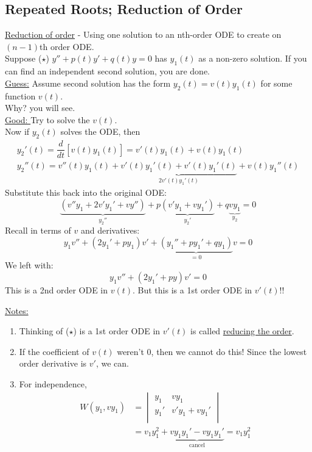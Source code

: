 \subsection*{Repeated Roots; Reduction of Order}
\underline{Reduction of order} - Using one solution to an nth-order ODE to create on $(n-1)$th order ODE.\\
Suppose ($\star$) $y'' + p(t)y' + q(t)y = 0$ has $y_1(t)$ as a non-zero solution. If you can find an independent second solution, you are done.\\
\underline{Guess:} Assume second solution has the form $y_2(t) = v(t)y_1(t)$ for some function $v(t)$.\\
Why? you will see.\\
\underline{Good: } Try to solve the $v(t)$.\\
Now if $y_2(t)$ solves the ODE, then
\begin{align*}
	y_2'(t) = \dfrac{d}{dt}[v(t)y_1(t)] = v'(t)y_1(t) + v(t)y_1(t)\\
	y_2''(t) = v''(t)y_1(t) + \underbrace{v'(t)y_1'(t) + v'(t)y_1'(t)}_{2v'(t)y_1'(t)} + v(t)y_1''(t)
\end{align*}
Substitute this back into the original ODE: 
\begin{equation*}
	\underbrace{(v''y_1 + 2v'y_1' + vy'')}_{y_2''} + p\underbrace{(v'y_1 + vy_1')}_{y_2'} + q \underbrace{vy_1}_{y_2} = 0
\end{equation*}
Recall in terms of $v$ and derivatives:
\begin{equation*}
	y_1v'' + (2y_1' + py_1)v' + \underbrace{(y_1'' + py_1' + qy_1)}_{=0}v = 0 \tag{we guess $y_2 = vy_1$}
\end{equation*}
We left with:
\begin{equation*}
	y_1v'' + (2y_1' + py)v' = 0 \tag{$\star$}
\end{equation*}
This is a 2nd order ODE in $v(t)$. But this is a 1st order ODE in $v'(t)$!!
\begin{center}
\end{center}
{\large \underline{Notes:}}
\begin{enumerate}[label=\protect\circled{\Roman*}]
	\item Thinking of ($\star$) is a 1st order ODE in $v'(t)$ is called \underline{reducing the order}.
	\item If the coefficient of $v(t)$ weren't $0$, then we cannot do this! Since the lowest order derivative is $v'$, we can.
	\item For independence,
	\begin{align*}
		W(y_1, vy_1) & = 
		\begin{vmatrix}
		y_1 & vy_1 \\
		y_1' & v'y_1 + vy_1' \\	
		\end{vmatrix}\\
		& = v_1y_1^2 + \underbrace{vy_1y_1' - vy_1y_1'}_{\text{cancel}} = v_1y_1^2
	\end{align*}
\end{enumerate}
